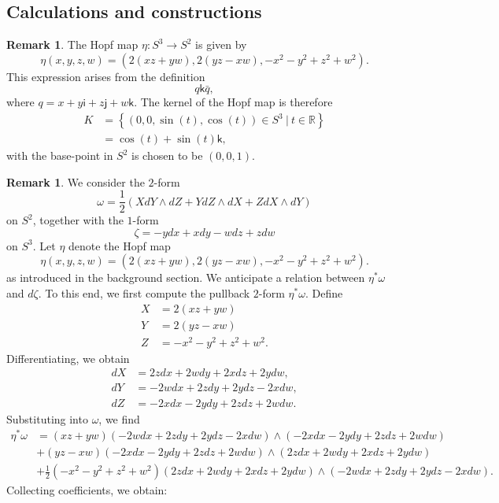\documentclass{article}
\theoremstyle{plain}
\theoremstyle{definition}
\newtheorem{rem}[thm]{Remark}
\begin{document}
\begin{appendices}

%
\section{Calculations and constructions}
\begin{rem}\label{kernelofhopf}
The Hopf map $\eta:S^3 \longrightarrow S^2$ is given by
\[
\eta(x,y,z,w) = \left(2(xz+yw),2(yz-xw),-x^2-y^2+z^2+w^2\right).
\]
This expression arises from the definition
\[
q\mathsf{k}\bar{q},
\]
where $q=x+y\mathsf{i}+z\mathsf{j}+w\mathsf{k}$. The kernel of the Hopf map is therefore
\begin{align*}
K & = \left\{(0,0,\sin(t),\cos(t)) \in S^3 ~ \big\vert ~ t \in \mathbb{R}\right\} \\
& = \cos(t) + \sin(t)\mathsf{k},
\end{align*}
with the base-point in $S^2$ is chosen to be $(0,0,1)$.
\end{rem}
\begin{rem}
We consider the $2$-form
\[
\omega = \frac{1}{2}\left(XdY \wedge dZ + YdZ \wedge dX + ZdX \wedge dY\right)
\]
on $S^2$, together with the $1$-form
\[
\zeta = -ydx+xdy-wdz+zdw
\]
on $S^3$. Let $\eta$ denote the Hopf map
\[
\eta(x,y,z,w) = \left(2(xz+yw),2(yz-xw),-x^2-y^2+z^2+w^2\right).
\]
as introduced in the background section. We anticipate a relation between $\eta^{\ast}\omega$ and $d\zeta$. To this end, we first compute the pullback $2$-form $\eta^{\ast}\omega$.
Define
\begin{align*}
X & = 2(xz+yw) \\
Y & = 2(yz-xw) \\
Z & = -x^2-y^2+z^2+w^2.
\end{align*}
Differentiating, we obtain
\begin{align*}
dX & = 2zdx+2wdy+2xdz+2ydw, \\
dY & = -2wdx+2zdy+2ydz-2xdw, \\
dZ & = -2xdx-2ydy+2zdz+2wdw.
\end{align*}
Substituting into $\omega$, we find
\begin{align*}
\eta^\ast\omega & = (xz+yw)(-2wdx+2zdy+2ydz-2xdw) \wedge (-2xdx-2ydy+2zdz+2wdw) \\
& + (yz-xw)(-2xdx-2ydy+2zdz+2wdw) \wedge (2zdx+2wdy+2xdz+2ydw) \\
& + \frac{1}{2}(-x^2-y^2+z^2+w^2)(2zdx+2wdy+2xdz+2ydw) \wedge (-2wdx+2zdy+2ydz-2xdw).
\end{align*}
Collecting coefficients, we obtain: \\

\end{rem}
\end{appendices}
\end{document}
